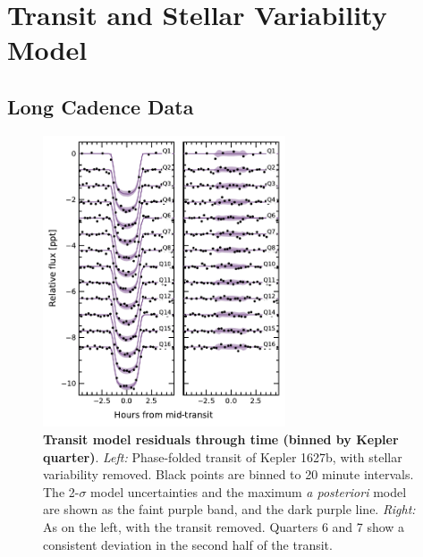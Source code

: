 \documentclass[12pt,modern,twocolumn,tighten]{aastex63}
\begin{document}
\section{Transit and Stellar Variability Model}
\label{app:gptransit}

\subsection{Long Cadence Data}
\begin{figure}[t]
	\begin{center}
		\leavevmode
		\includegraphics[width=0.64\textwidth]{f9.pdf}
	\end{center}
	\vspace{-0.7cm}
	\caption{
		{\bf Transit model residuals through time (binned by Kepler quarter)}.  
    {\it Left:}
    Phase-folded transit of Kepler 1627b, with stellar variability
    removed.  Black points are binned to 20
    minute intervals.  The 2-$\sigma$ model uncertainties and the
    maximum {\it a posteriori} model are shown as the faint purple
    band, and the dark purple line.
    {\it Right:}
    As on the left, with the transit removed.  Quarters 6 and 7 show a
    consistent deviation in the second half of the transit.
		\label{fig:phasequarter}
	}
\end{figure}
\end{document}
